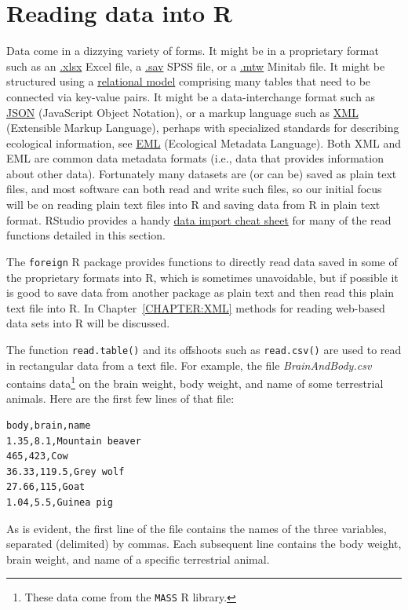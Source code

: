 \documentclass[12pt,oneside]{book}\usepackage[]{graphicx}\usepackage[]{color}
\begin{document}
\section{Reading data into R}
Data come in a dizzying variety of forms. It might be in a proprietary format such as an \href{https://en.wikipedia.org/wiki/Microsoft\_Excel}{.xlsx} Excel file, a \href{https://en.wikipedia.org/wiki/SPSS}{.sav} SPSS file, or a \href{https://en.wikipedia.org/wiki/Minitab}{.mtw} Minitab file. It might be structured using a \href{https://en.wikipedia.org/wiki/Relational_model}{relational model} comprising many tables that need to be connected via key-value pairs. It might be a data-interchange format such as \href{http://www.json.org/}{JSON} (JavaScript Object Notation),  or a markup language such as \href{https://en.wikipedia.org/wiki/XML}{XML} (Extensible Markup Language), perhaps with specialized standards for describing ecological information, see \href{https://en.wikipedia.org/wiki/Ecological_Metadata_Language}{EML} (Ecological Metadata Language). Both XML and EML are common data metadata formats (i.e., data that provides information about other data). Fortunately many datasets are (or can be) saved as plain text files, and most software can both read and write such files, so our initial focus will be on reading plain text files into R and saving data from R in plain text format. RStudio provides a handy \href{http://www.rstudio.com/resources/cheatsheets}{data import cheat sheet} for many of the read functions detailed in this section.

The \verb+foreign+ R package provides functions to directly read data saved in some of the proprietary formats into R, which is sometimes unavoidable, but if possible it is good to save data from  another package as plain text and then read this plain text file into R. In Chapter~\ref{CHAPTER:XML} methods for reading web-based data sets into R will be discussed.

The function \verb+read.table()+ and its offshoots such as \verb+read.csv()+ are used to read in rectangular data from a text file. For example, the file \emph{BrainAndBody.csv} contains data\footnote{These data come from the \texttt{MASS} R library.} on the brain weight, body weight, and name of some terrestrial animals. Here are the first few lines of that file:
\begin{verbatim}
body,brain,name
1.35,8.1,Mountain beaver
465,423,Cow
36.33,119.5,Grey wolf
27.66,115,Goat
1.04,5.5,Guinea pig
\end{verbatim}
As is evident, the first line of the file contains the names of the three variables, separated (delimited) by commas. Each subsequent line contains the body weight, brain weight, and name of a specific terrestrial animal.
\end{document}
